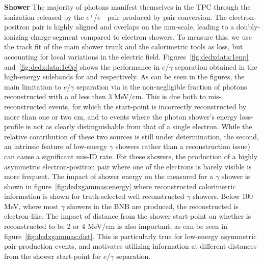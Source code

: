 \par \textbf{Shower \dedx} The majority of photons manifest themselves in the TPC through the ionization released by the $e^+$/$e^-$ pair produced by pair-conversion. The electron-positron pair is highly aligned and overlaps on the mm-scale, leading to a doubly-ionizing charge-segment compared to electron showers. To measure this, we use the track fit of the main shower trunk and the calorimetric tools as loss, but accounting for local variations in the electric field. Figures~\ref{fig:dedxdata:1enp} and~\ref{fig:dedxdata:1e0p} shows the performance in $e$/$\gamma$ separation obtained in the high-energy sidebands for \npsel and \zpsel respectively. As can be seen in the figures, the main limitation to $e$/$\gamma$ separation via \dedx is the non-negligible fraction of photons reconstructed with a \dedx of less then 3 MeV/cm. This is due both to mis-reconstructed events, for which the start-point is incorrectly reconstructed by more than one or two cm, and to events where the photon shower's energy loss-profile is not as clearly distinguishable from that of a single electron. While the relative contribution of these two sources is still under determination, the second, an intrinsic feature of low-energy $\gamma$ showers rather than a reconstruction issue) can cause a significant mis-ID rate. For these showers, the production of a highly asymmetric electron-positron pair where one of the electrons is barely visible is more frequent. The impact of shower energy on the measured \dedx for a $\gamma$ shower is shown in figure~\ref{fig:dedxgammas:energy} where reconstructed calorimetric information is shown for truth-selected well reconstructed $\gamma$ showers. Below 100 MeV, where most $\gamma$ showers in the BNB are produced, the reconstructed \dedx is electron-like. The impact of distance from the shower start-point on whether \dedx is reconstructed to be 2 or 4 MeV/cm is also important, as can be seen in figure~\ref{fig:dedxgammas:dist}. This is particularly true for low-energy asymmetric pair-production events, and motivates utilizing \dedx information at different distances from the shower start-point for $e$/$\gamma$ separation. 




